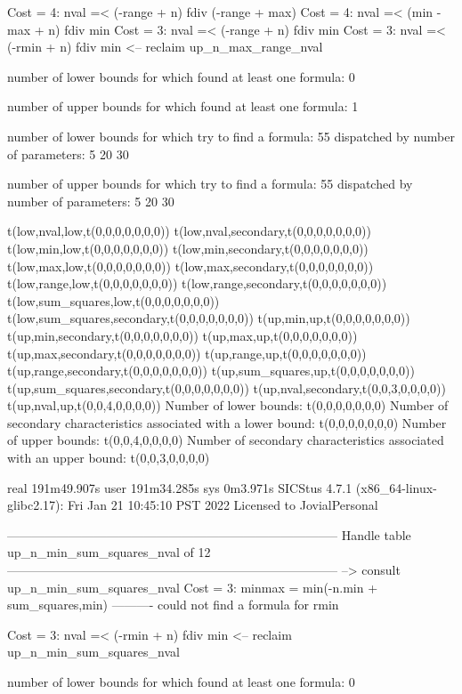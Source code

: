 Cost =  4:  nval =< (-range + n) fdiv (-range + max)
Cost =  4:  nval =< (min - max + n) fdiv min
Cost =  3:  nval =< (-range + n) fdiv min
Cost =  3:  nval =< (-rmin + n) fdiv min
<-- reclaim up_n_max_range_nval

number of lower bounds for which found at least one formula: 0

number of upper bounds for which found at least one formula: 1

number of lower bounds for which try to find a formula: 55
dispatched by number of parameters: 5  20  30

number of upper bounds for which try to find a formula: 55
dispatched by number of parameters: 5  20  30

t(low,nval,low,t(0,0,0,0,0,0,0))
t(low,nval,secondary,t(0,0,0,0,0,0,0))
t(low,min,low,t(0,0,0,0,0,0,0))
t(low,min,secondary,t(0,0,0,0,0,0,0))
t(low,max,low,t(0,0,0,0,0,0,0))
t(low,max,secondary,t(0,0,0,0,0,0,0))
t(low,range,low,t(0,0,0,0,0,0,0))
t(low,range,secondary,t(0,0,0,0,0,0,0))
t(low,sum_squares,low,t(0,0,0,0,0,0,0))
t(low,sum_squares,secondary,t(0,0,0,0,0,0,0))
t(up,min,up,t(0,0,0,0,0,0,0))
t(up,min,secondary,t(0,0,0,0,0,0,0))
t(up,max,up,t(0,0,0,0,0,0,0))
t(up,max,secondary,t(0,0,0,0,0,0,0))
t(up,range,up,t(0,0,0,0,0,0,0))
t(up,range,secondary,t(0,0,0,0,0,0,0))
t(up,sum_squares,up,t(0,0,0,0,0,0,0))
t(up,sum_squares,secondary,t(0,0,0,0,0,0,0))
t(up,nval,secondary,t(0,0,3,0,0,0,0))
t(up,nval,up,t(0,0,4,0,0,0,0))
Number of lower bounds:                                             t(0,0,0,0,0,0,0)
Number of secondary characteristics associated with a lower bound:  t(0,0,0,0,0,0,0)
Number of upper bounds:                                             t(0,0,4,0,0,0,0)
Number of secondary characteristics associated with an upper bound: t(0,0,3,0,0,0,0)

real	191m49.907s
user	191m34.285s
sys	0m3.971s
SICStus 4.7.1 (x86_64-linux-glibc2.17): Fri Jan 21 10:45:10 PST 2022
Licensed to JovialPersonal


--------------------------------------------------------------------------------
Handle table up_n_min_sum_squares_nval of 12
--------------------------------------------------------------------------------
--> consult up_n_min_sum_squares_nval
Cost =  3:  minmax = min(-n.min + sum_squares,min)
----------
could not find a formula for rmin

Cost =  3:  nval =< (-rmin + n) fdiv min
<-- reclaim up_n_min_sum_squares_nval

number of lower bounds for which found at least one formula: 0

